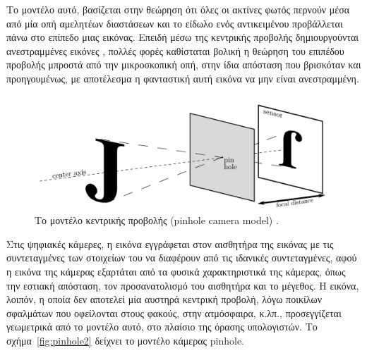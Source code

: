 Το μοντέλο αυτό, βασίζεται στην θεώρηση ότι όλες οι ακτίνες φωτός περνούν μέσα από μία οπή αμελητέων διαστάσεων και το είδωλο ενός αντικειμένου προβάλλεται πάνω στο επίπεδο μιας εικόνας. Επειδή μέσω της κεντρικής προβολής δημιουργούνται ανεστραμμένες εικόνες \cite{fig:pinhole3}, πολλές φορές καθίσταται βολική η θεώρηση του επιπέδου προβολής μπροστά από την μικροσκοπική οπή, στην ίδια απόσταση που βρισκόταν και προηγουμένως, με αποτέλεσμα η φανταστική αυτή εικόνα να μην είναι ανεστραμμένη. 



\begin{figure}[H]
    \centering
    \includegraphics[scale=0.5, angle=0]{Files/Figures/pinhole3.png}
    \caption[Το μοντέλο κεντρικής προβολής (pinhole camera model)]{ Το μοντέλο κεντρικής προβολής (pinhole camera model) \cite{pinhole} .}
    \label{fig:pinhole3}
\end{figure}


Στις ψηφιακές κάμερες, η εικόνα εγγράφεται στον αισθητήρα της εικόνας με τις συντεταγμένες των στοιχείων του να διαφέρουν από τις ιδανικές συντεταγμένες, αφού η εικόνα της κάμερας εξαρτάται από τα φυσικά χαρακτηριστικά της κάμερας, όπως την εστιακή απόσταση, τον προσανατολισμό του αισθητήρα και το μέγεθος. H εικόνα, λοιπόν, η οποία δεν αποτελεί μία αυστηρά κεντρική προβολή, λόγω ποικίλων σφαλμάτων που οφείλονται στους φακούς, στην ατμόσφαιρα, κ.λπ., προσεγγίζεται γεωμετρικά από το μοντέλο αυτό, στο πλαίσιο της όρασης υπολογιστών. Το σχήμα~\ref{fig:pinhole2} δείχνει το μοντέλο κάμερας pinhole. 





